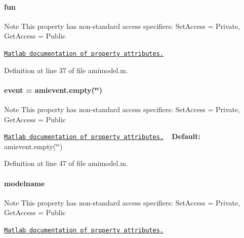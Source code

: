 \paragraph[{fun}]{\setlength{\rightskip}{0pt plus 5cm}fun}\label{classamimodel_a743fa290dbc0a67a3843d5ab0426e9b4}
\begin{DoxyNote}{Note}
This property has non-\/standard access specifiers\+: {\ttfamily Set\+Access = Private, Get\+Access = Public} 

\href{http://www.mathworks.com/help/matlab/matlab_oop/property-attributes.html}{\tt Matlab documentation of property attributes.} 
\end{DoxyNote}


Definition at line 37 of file amimodel.\+m.

\hypertarget{classamimodel_a3b65133bb9997cd1ccf311af0927fc9e}{}
\paragraph[{event}]{\setlength{\rightskip}{0pt plus 5cm}event = amievent.\+empty(\char`\"{}\char`\"{})}\label{classamimodel_a3b65133bb9997cd1ccf311af0927fc9e}
\begin{DoxyNote}{Note}
This property has non-\/standard access specifiers\+: {\ttfamily Set\+Access = Private, Get\+Access = Public} 

\href{http://www.mathworks.com/help/matlab/matlab_oop/property-attributes.html}{\tt Matlab documentation of property attributes.} ~\newline
{\bfseries Default\+:} amievent.\+empty(\char`\"{}\char`\"{}) 
\end{DoxyNote}


Definition at line 47 of file amimodel.\+m.

\hypertarget{classamimodel_a71bca9c21a6de42d8079ade31cb61044}{}
\paragraph[{modelname}]{\setlength{\rightskip}{0pt plus 5cm}modelname}\label{classamimodel_a71bca9c21a6de42d8079ade31cb61044}
\begin{DoxyNote}{Note}
This property has non-\/standard access specifiers\+: {\ttfamily Set\+Access = Private, Get\+Access = Public} 

\href{http://www.mathworks.com/help/matlab/matlab_oop/property-attributes.html}{\tt Matlab documentation of property attributes.} 
\end{DoxyNote}


